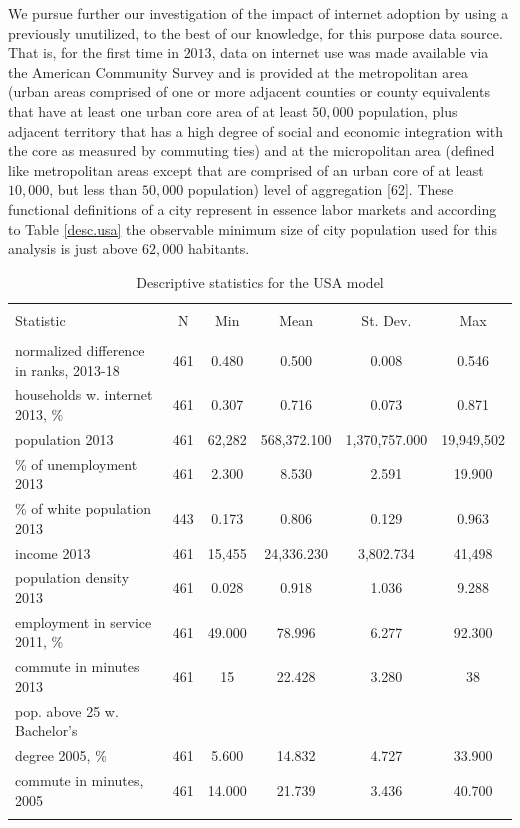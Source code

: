 \documentclass[10pt,letterpaper]{article}
\begin{document}
We pursue further our investigation of the impact of internet adoption
by using a previously unutilized, to the best of our knowledge, for this
purpose data source. That is, for the first time in \(2013\), data on
internet use was made available via the American Community Survey and is
provided at the metropolitan area (urban areas comprised of one or more
adjacent counties or county equivalents that have at least one urban
core area of at least \(50,000\) population, plus adjacent territory
that has a high degree of social and economic integration with the core
as measured by commuting ties) and at the micropolitan area (defined
like metropolitan areas except that are comprised of an urban core of at
least \(10,000\), but less than \(50,000\) population) level of
aggregation {[}62{]}. These functional definitions of a city represent
in essence labor markets and according to Table \ref{desc.usa} the
observable minimum size of city population used for this analysis is
just above \(62,000\) habitants.

\begin{table}[!htbp] \centering 
  \caption{Descriptive statistics for the USA model\label{desc.usa}} 
  \label{} 
\small 
\begin{tabular}{@{\extracolsep{1pt}}lccccc} 
\\[-1.8ex]\hline 
\hline \\[-1.8ex] 
Statistic & \multicolumn{1}{c}{N} & \multicolumn{1}{c}{Min} & \multicolumn{1}{c}{Mean} & \multicolumn{1}{c}{St. Dev.} & \multicolumn{1}{c}{Max} \\ 
\hline \\[-1.8ex] 
normalized difference in ranks, 2013-18 & 461 & 0.480 & 0.500 & 0.008 & 0.546 \\ 
households w. internet 2013, \% & 461 & 0.307 & 0.716 & 0.073 & 0.871 \\ 
population 2013 & 461 & 62,282 & 568,372.100 & 1,370,757.000 & 19,949,502 \\ 
\% of unemployment 2013 & 461 & 2.300 & 8.530 & 2.591 & 19.900 \\ 
\% of white population 2013 & 443 & 0.173 & 0.806 & 0.129 & 0.963 \\ 
income 2013 & 461 & 15,455 & 24,336.230 & 3,802.734 & 41,498 \\ 
population density 2013 & 461 & 0.028 & 0.918 & 1.036 & 9.288 \\ 
employment in service 2011, \% & 461 & 49.000 & 78.996 & 6.277 & 92.300 \\ 
commute in minutes 2013 & 461 & 15 & 22.428 & 3.280 & 38 \\ 
pop. above 25 w. Bachelor's \\
                             degree 2005, \% & 461 & 5.600 & 14.832 & 4.727 & 33.900 \\ 
commute in minutes, 2005 & 461 & 14.000 & 21.739 & 3.436 & 40.700 \\ 
\hline \\[-1.8ex] 
\end{tabular} 
\end{table}
\end{document}
